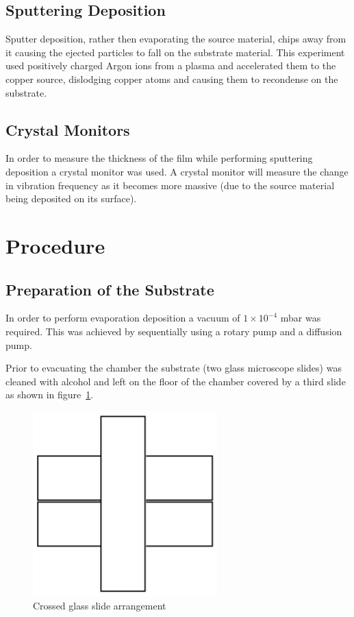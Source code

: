 \documentclass[aps,prl,twocolumn,groupedaddress,showkeys]{revtex4}
\begin{document}
\subsection{Sputtering Deposition}

Sputter deposition, rather then evaporating the source material, chips away from it causing the ejected particles to fall on the substrate material. This experiment used positively charged Argon ions from a plasma and accelerated them to the copper source, dislodging copper atoms and causing them to recondense on the substrate.


\subsection{Crystal Monitors}

In order to measure the thickness of the film while performing sputtering deposition a crystal monitor was used. A crystal monitor will measure the change in vibration frequency as it becomes more massive (due to the source material being deposited on its surface).


\section{Procedure}

\subsection{Preparation of the Substrate}

In order to perform evaporation deposition a vacuum of $1\times10^{-4}$ mbar was required. This was achieved by sequentially using a rotary pump and a diffusion pump.

Prior to evacuating the chamber the substrate (two glass microscope slides) was cleaned with alcohol and left on the floor of the chamber covered by a third slide as shown in figure~\ref{fig:slideArrangement}.

\begin{figure}[h]
	\includegraphics[width=0.6\linewidth]{glassSlideArrangement.png}
	\caption{Crossed glass slide arrangement}
	\label{fig:slideArrangement}
\end{figure}
\end{document}
